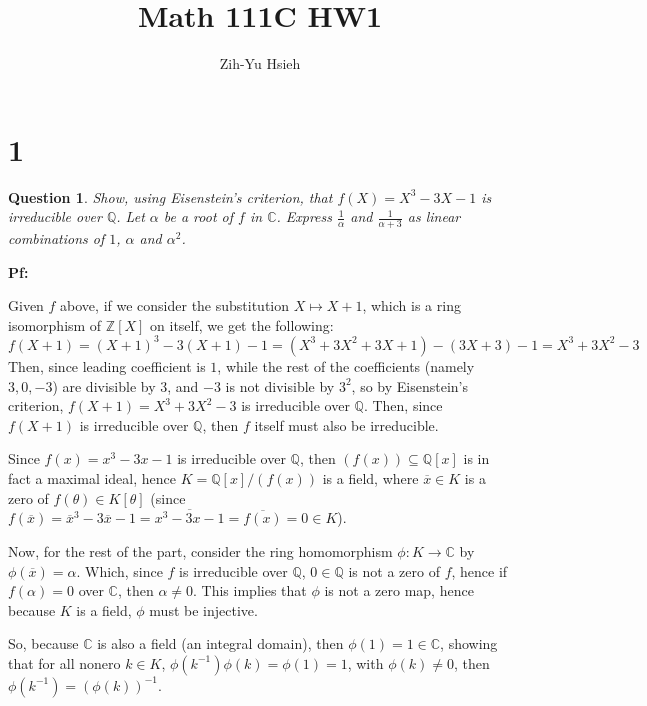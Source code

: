 \documentclass{article}
\title{Math 111C HW1}
\author{Zih-Yu Hsieh}
\newtheorem{question}{Question}
\begin{document}
\maketitle

\section*{1}
\begin{myBox}[]{}
    \begin{question}
        Show, using Eisenstein's criterion, that $f(X)=X^3-3X-1$ is irreducible over $\mathbb{Q}$. Let $\alpha$ be a root of $f$ in $\mathbb{C}$. 
        Express $\frac{1}{\alpha}$ and $\frac{1}{\alpha+3}$ as linear combinations of $1$, $\alpha$ and $\alpha^2$.
    \end{question}
\end{myBox}

\textbf{Pf:}

Given $f$ above, if we consider the substitution $X\mapsto X+1$, which is a ring isomorphism of $\mathbb{Z}[X]$ on itself, we get the following:
$$f(X+1)=(X+1)^3-3(X+1)-1=(X^3+3X^2+3X+1)-(3X+3)-1=X^3+3X^2-3$$
Then, since leading coefficient is $1$, while the rest of the coefficients (namely $3,0,-3$) are divisible by $3$, and $-3$ is not divisible by $3^2$,
so by Eisenstein's criterion, $f(X+1)=X^3+3X^2-3$ is irreducible over $\mathbb{Q}$. Then, since $f(X+1)$ is irreducible over $\mathbb{Q}$, then $f$ itself must also be irreducible.

Since $f(x)=x^3-3x-1$ is irreducible over $\mathbb{Q}$, then $(f(x))\subseteq\mathbb{Q}[x]$ is in fact a maximal ideal, hence $K=\mathbb{Q}[x]/(f(x))$ is a field, where $\overline{x}\in K$ is a zero of 
$f(\theta)\in K[\theta]$ (since $f(\overline{x})=\overline{x}^3-3\overline{x}-1=\overline{x^3-3x-1}=\overline{f(x)}=0\in K$).

\hfil

Now, for the rest of the part, consider the ring homomorphism $\phi:K\rightarrow \mathbb{C}$ by $\phi(\overline{x})=\alpha$. Which, since $f$ is irreducible over $\mathbb{Q}$, $0\in\mathbb{Q}$ is not a zero of $f$,
hence if $f(\alpha)=0$ over $\mathbb{C}$, then $\alpha\neq 0$. This implies that $\phi$ is not a zero map, hence because $K$ is a field, $\phi$ must be injective.

So, because $\mathbb{C}$ is also a field (an integral domain), then $\phi(1)=1\in\mathbb{C}$, showing that for all nonero $k\in K$, $\phi(k^{-1})\phi(k)=\phi(1)=1$, with $\phi(k)\neq 0$, then $\phi(k^{-1})=(\phi(k))^{-1}$.
\end{document}
